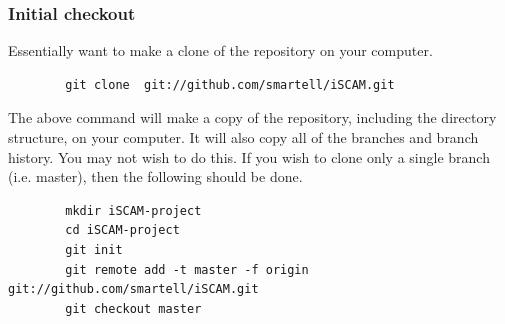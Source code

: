 \begin{frame}[fragile]
	\frametitle{Initial checkout}
	Essentially want to make a clone of the repository on your computer.
	\vfill
	
	\begin{tiny}
	\begin{verbatim}
		git clone  git://github.com/smartell/iSCAM.git
	\end{verbatim}
	\end{tiny}
	\vfill
	The above command will make a copy of the repository, including the directory structure, on your computer. It will also copy all of the branches and branch history. You may not wish to do this.  If you wish to clone only a single branch (i.e. master), then the following should be done.
	
	\begin{tiny}
	\begin{verbatim}
		mkdir iSCAM-project
		cd iSCAM-project
		git init
		git remote add -t master -f origin git://github.com/smartell/iSCAM.git
		git checkout master
	\end{verbatim}
	\end{tiny}
\end{frame}


